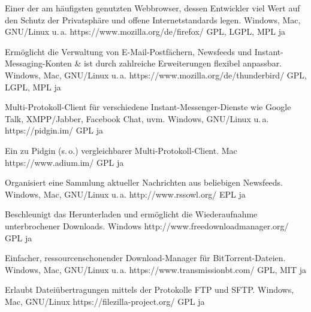 




{Einer der am häufigsten genutzten Webbrowser, dessen Entwickler viel Wert auf den Schutz der Privatsphäre und offene Internetstandards legen.}
{Windows, Mac, GNU/Linux u.\,a.}
{https://www.mozilla.org/de/firefox/}
{GPL, LGPL, MPL}
{ja}

{Ermöglicht die Verwaltung von E-Mail-Postfächern, Newsfeeds und Instant-Messaging-Konten \& ist durch zahlreiche Erweiterungen flexibel anpassbar.}
{Windows, Mac, GNU/Linux u.\,a.}
{https://www.mozilla.org/de/thunderbird/}
{GPL, LGPL, MPL}
{ja}

{Multi-Protokoll-Client für verschiedene Instant-Messenger-Dienste wie \mbox{Google} Talk, XMPP/Jabber, Facebook Chat, uvm.}
{Windows, GNU/Linux u.\,a.}
{https://pidgin.im/}
{GPL}
{ja}

{Ein zu Pidgin (s.\,o.) vergleichbarer Multi-Protokoll-Client.}
{Mac}
{https://www.adium.im/}
{GPL}
{ja}

{Organisiert eine Sammlung aktueller Nachrichten aus beliebigen Newsfeeds.}
{Windows, Mac, GNU/Linux u.\,a.}
{http://www.rssowl.org/}
{EPL}
{ja}

{Beschleunigt das Herunterladen und ermöglicht die Wiederaufnahme unterbrochener Downloads.}
{Windows}
{http://www.freedownloadmanager.org/}
{GPL}
{ja}

{Einfacher, ressourcenschonender Download-Manager für BitTorrent-Dateien.}
{Windows, Mac, GNU/Linux u.\,a.}
{https://www.transmissionbt.com/}
{GPL, MIT}
{ja}

{Erlaubt Dateiübertragungen mittels der Protokolle FTP und SFTP.}
{Windows, Mac, GNU/Linux}
{https://filezilla-project.org/}
{GPL}
{ja}

\backpage


